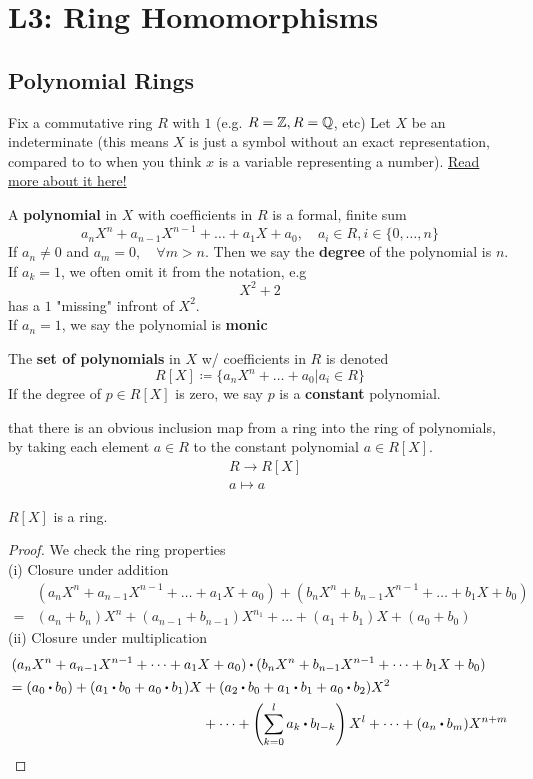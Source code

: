 \documentclass[../Main.tex]{subfiles}
\begin{document}
	\chapter{L3: Ring Homomorphisms}
	\section*{Polynomial Rings}
	Fix a commutative ring $R$ with $1$ (e.g. $R=\mathbb{Z}, R=\mathbb{Q}$, etc)
	Let $X$ be an indeterminate (this means $X$ is just a symbol without an exact representation, compared to to when you think $x$ is a variable representing a number). \href{https://en.wikipedia.org/wiki/Indeterminate_(variable)}{Read more about it here!}
	\begin{dfn}[title = Polynomial in a ring]
		A \textbf{polynomial} in $X$ with coefficients in $R$ is a formal, finite sum
		\[a_nX^n+a_{n-1}X^{n-1}+\dots+a_1X+a_0, \quad a_i\in R, i\in \{0, \dots, n\}\]
		\Note If $a_n\ne 0$ and $a_m=0, \quad \forall m>n$. Then we say the \textbf{degree} of the polynomial is $n$.
		If $a_k=1$, we often omit it from the notation, e.g
		\[X^2+2\]
		has a $1$ "missing" infront of $X^2$.\\
		If $a_n=1$, we say the polynomial is \textbf{monic} 
	\end{dfn}
	\begin{dfn}[title=Ring of Polynomials and Constant Polynomial]
		The \textbf{set of polynomials} in $X$ w/ coefficients in $R$ is denoted
		\[R[X] \coloneqq \{a_nX^n+\dots+a_0|a_i \in R\} \]
		If the degree of $p\in R[X]$ is zero, we say $p$ is a \textbf{constant} polynomial.
	\end{dfn}
	\Obs that there is an obvious inclusion map from a ring into the ring of polynomials, by taking each element $a\in R$ to the constant polynomial $a\in R[X]$.
	\begin{align*}
		&R \to R[X]\\
		&a\mapsto a
	\end{align*}
	\begin{claim}
		$R[X]$ is a ring.
	\end{claim}
	\begin{proof}We check the ring properties \\
		(i) Closure under addition
		\begin{align*}
		&(a_nX^n+a_{n-1}X^{n-1}+\dots+ a_1X+a_0) + (b_nX^n+b_{n-1}X^{n-1}+\dots+b_1X+b_0) \\
		=& (a_n+b_n)X^n +(a_{n-1}+b_{n-1})X^{n_1}+\dots+(a_1+b_1)X+(a_0+b_0)
		\end{align*}
		(ii) Closure under multiplication
		\begin{align*}
			&(a_nX^n+a_{n-1}X^{n-1}+\dots+ a_1X+a_0) \rdot (b_nX^n+b_{n-1}X^{n-1}+\dots+b_1X+b_0) \\
			& \begin{aligned}=(a_0\rdot b_0)+(a_1\rdot b_0+a_0\rdot b_1)X &+ (a_2\rdot b_0 + a_1\rdot b_1+a_0\rdot b_2)X^2\\
			&+\dots+\left(\sum_{k=0}^{l}a_k\rdot b_{l-k}\right) X^l + \dots + (a_n\rdot b_m)X^{n+m} \qedhere
			\end{aligned}
		\end{align*}
	\end{proof}
\end{document}
